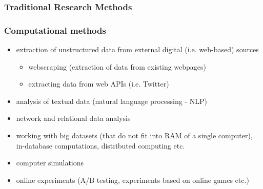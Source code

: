 \begin{frame}
    \frametitle{Traditional Research Methods}
\end{frame}

\begin{frame}
    \frametitle{Computational methods}
    \begin{itemize}
        \item<1> extraction of unstructured data from external digital (i.e. web-based) sources
        \begin{itemize}
            \item<1> webscraping (extraction of data from existing webpages)
            \item<1> extracting data from web APIs (i.e. Twitter)
        \end{itemize}
        \item<1> analysis of textual data (natural language processing - NLP)
        \item<0> network and relational data analysis
        \item<0> working with big datasets (that do not fit into RAM of a single computer), in-database computations, distributed computing etc.
        \item<0> computer simulations
        \item<0> online experiments (A/B testing, experiments based on online games etc.)
    \end{itemize}
\end{frame}

